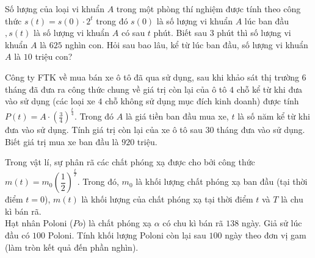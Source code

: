 \begin{ex}%
	Số lượng của loại vi khuẩn $A$ trong một phòng thí nghiệm được tính theo công thức $s(t)=s(0) \cdot 2^t$ trong đó $s(0)$ là số lượng vi khuẩn $A$ lúc ban đầu $,s(t)$ là  số lượng vi khuẩn $A$ có sau $t$ phút. Biết sau $3$ phút thì số lượng vi khuẩn $A$ là $625$ nghìn con. Hỏi sau bao lâu, kể từ lúc ban đầu, số lượng vi khuẩn $A$ là $10$ triệu con?
\end{ex}

\begin{ex}%
	Công ty FTK về mua bán xe ô tô đã qua sử dụng, sau khi khảo sát thị trường $6$ tháng đã đưa ra công thức chung về giá trị còn lại của ô tô $4$ chỗ kể từ khi đưa vào sử dụng (các loại xe $4$ chỗ không sử dụng mục đích kinh doanh) được tính $P(t)=A\cdot\left(\frac{3}{4}\right)^\frac{t}{4}$. Trong đó $A$ là giá tiền ban đầu  mua xe, $t$ là số năm kể từ khi đưa vào sử dụng.
	Tính giá trị còn lại  của xe ô tô sau $30$ tháng đưa vào sử dụng. Biết giá trị mua xe ban đầu là $920$ triệu.
\end{ex}

\begin{bt}%
	 Trong vật lí, sự phân rã các chất phóng xạ được cho bởi công thức $m(t) = m_0 \left(\dfrac{1}{2}\right)^{\tfrac{t}{T}}$. Trong đó, $m_0$ là khối lượng chất phóng xạ ban đầu (tại thời điểm $t= 0$), $m(t)$ là khối lượng của chất phóng xạ tại thời điểm $t$ và $T$ là chu kì bán rã.\\
	Hạt nhân Poloni ($Po$) là chất phóng xạ $\alpha$ có chu kì bán rã $138$ ngày. Giả sử  lúc đầu có $100$ Poloni. Tính khối lượng Poloni còn lại sau $100$ ngày theo đơn vị gam (làm tròn kết quả đến phần nghìn).
\end{bt}

